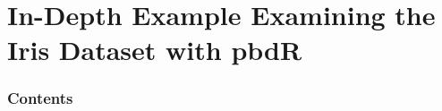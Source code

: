 

\section[Iris]{In-Depth Example Examining the Iris Dataset with pbdR}

\hidenum
\begin{frame}[noframenumbering]
\frametitle{Contents}
 \tableofcontents[currentsection,hideothersubsections,sectionstyle=show/hide]
\end{frame}
\shownum


